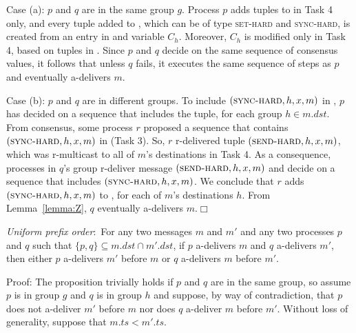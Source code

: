 Case (a): $p$ and $q$ are in the same group $g$.
Process $p$ adds tuples to \Buffer in Task 4 only, and every tuple added to \Buffer, which can be of type \textsc{set-hard} and \textsc{sync-hard}, is created from an entry in \Decided and variable $C_h$.
Moreover, $C_h$ is modified only in Task 4, based on tuples in \Decided.
Since $p$ and $q$ decide on the same sequence of consensus values, it follows that unless $q$ fails, it executes the same sequence of steps as $p$ and eventually a-delivers $m$.

Case (b): $p$ and $q$ are in different groups.
To include $(\textsc{sync-hard}, h, x, m)$ in \Buffer, $p$ has decided on a sequence that includes the tuple, for each group $h \in m.dst$.
From consensus, some process $r$ proposed a sequence that contains $(\textsc{sync-hard}, h, x, m)$ in \Pend (Task 3).
So, $r$ r-delivered tuple $(\textsc{send-hard}, h, x, m)$, which was r-multicast to all of $m$'s destinations in Task 4.
As a consequence, processes in $q$'s group r-deliver message $(\textsc{send-hard}, h, x, m)$ and decide on a sequence that includes $(\textsc{sync-hard}, h, x, m)$.
We conclude that $r$ adds $(\textsc{sync-hard}, h, x, m)$ to \Buffer, for each of $m$'s destinations $h$.
From Lemma~\ref{lemma:Z}, $q$ eventually a-delivers $m$.\hfill$\Box$


\begin{proposition}
\textit{Uniform prefix order}:~For any two messages $m$ and $m'$ and any two processes $p$ and $q$ such that $\lbrace p, q\rbrace \subseteq m.\mathit{dst} \cap m'.\mathit{dst}$, if $p$ a-delivers $m$ and $q$ a-delivers $m'$, then either $p$ a-delivers $m'$ before $m$ or $q$ a-delivers $m$ before $m'$.
\end{proposition}
\noindent
{\sc Proof:} 
The proposition trivially holds if $p$ and $q$ are in the same group, so assume $p$ is in group $g$ and $q$ is in group $h$ and suppose, by way of contradiction, that $p$ does not a-deliver $m'$ before $m$ nor does $q$ a-deliver $m$ before $m'$. 
Without loss of generality, suppose that $m.ts < m'.ts$. 

